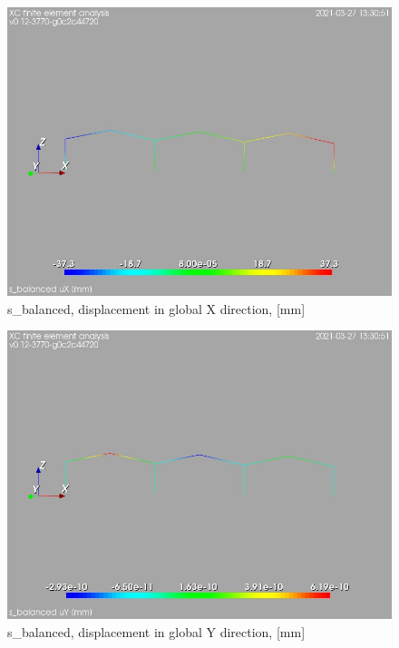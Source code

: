 \cleardoublepage
\begin{figure}
\begin{center}
\includegraphics[width=\linewidth]{calc_results/sole_zeinali/text/graphics/resSimplLC/s_balancedtotaluX}
\caption{s_balanced, displacement in global X direction, [mm]}
\end{center}
\end{figure}
\begin{figure}
\begin{center}
\includegraphics[width=\linewidth]{calc_results/sole_zeinali/text/graphics/resSimplLC/s_balancedtotaluY}
\caption{s_balanced, displacement in global Y direction, [mm]}
\end{center}
\end{figure}
